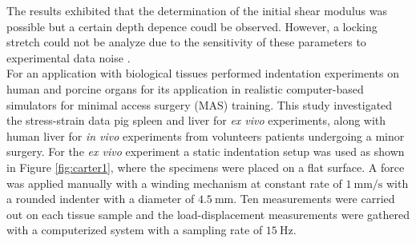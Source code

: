 The results exhibited that the determination of the initial shear modulus was possible but a 
certain depth depence coudl be observed. However, a locking stretch could not be analyze due to the 
sensitivity of these parameters to experimental data noise \cite{Zhang2014}.\\

For an application with biological tissues \citet{Carter2001} performed indentation experiments on 
human and porcine organs for its application in realistic computer-based simulators 
for minimal access surgery (MAS) training. 
This study investigated the stress-strain data pig spleen and liver for \textit{ex vivo} experiments, 
along with human liver for \textit{in vivo} experiments from volunteers patients undergoing a minor 
surgery. For the \textit{ex vivo} experiment a static indentation setup was used as shown in Figure 
\ref{fig:carter1}, where the specimens were placed on a flat surface. A force was applied 
manually with a winding mechanism at constant rate of $\SI[per-mode = symbol]{1}{\milli \m\per \second}$ 
with a rounded indenter with a diameter of $\SI{4.5}{\milli \m}$. Ten measurements were 
carried out on each tissue sample and the load-displacement measurements were 
gathered with a computerized system with a sampling rate of $\SI{15}{\hertz}$.\\


